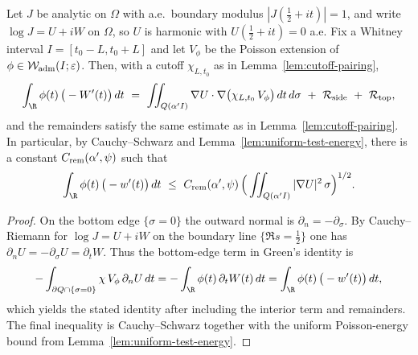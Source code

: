 \begin{lemma}\label{lem:CR-green-phase}
Let \(J\) be analytic on \(\Omega\) with a.e.\ boundary modulus \(|J(\tfrac12+it)|=1\), and write \(\log J=U+iW\) on \(\Omega\), so \(U\) is harmonic with \(U(\tfrac12+it)=0\) a.e.
Fix a Whitney interval \(I=[t_0-L,t_0+L]\) and let \(V_\phi\) be the Poisson extension of \(\phi\in\mathcal W_{\rm adm}(I;\varepsilon)\).
Then, with a cutoff \(\chi_{L,t_0}\) as in Lemma~\ref{lem:cutoff-pairing},
\[
  \int_{\R} \phi(t)\,\big(-W'(t)\big)\,dt
  \ =\ \iint_{Q(\alpha'I)} \nabla U\cdot \nabla\big(\chi_{L,t_0}\,V_\phi\big)\,dt\,d\sigma\ +\ \mathcal R_{\mathrm{side}}\ +\ \mathcal R_{\mathrm{top}},
\]
and the remainders satisfy the same estimate as in Lemma~\ref{lem:cutoff-pairing}.
In particular, by Cauchy--Schwarz and Lemma~\ref{lem:uniform-test-energy}, there is a constant \(C_{\rm rem}(\alpha',\psi)\) such that
\[
  \int_{\R} \phi(t)\,\big(-w'(t)\big)\,dt\ \le\ C_{\rm rem}(\alpha',\psi)\,\Big(\iint_{Q(\alpha'I)} |\nabla U|^2\,\sigma\Big)^{1/2}.
\]
\end{lemma}
\begin{proof}
On the bottom edge \(\{\sigma=0\}\) the outward normal is \(\partial_n=-\partial_\sigma\).
By Cauchy--Riemann for \(\log J=U+iW\) on the boundary line \(\{\Re s=\tfrac12\}\) one has \(\partial_n U=-\partial_\sigma U=\partial_t W\).
Thus the bottom-edge term in Green's identity is
\[
  -\int_{\partial Q\cap\{\sigma=0\}} \chi\,V_\phi\,\partial_n U\,dt
  = -\int_{\R} \phi(t)\,\partial_t W(t)\,dt
  = \int_{\R} \phi(t)\,\big(-w'(t)\big)\,dt,
\]
which yields the stated identity after including the interior term and remainders.
The final inequality is Cauchy--Schwarz together with the uniform Poisson-energy bound from Lemma~\ref{lem:uniform-test-energy}.
\end{proof}

